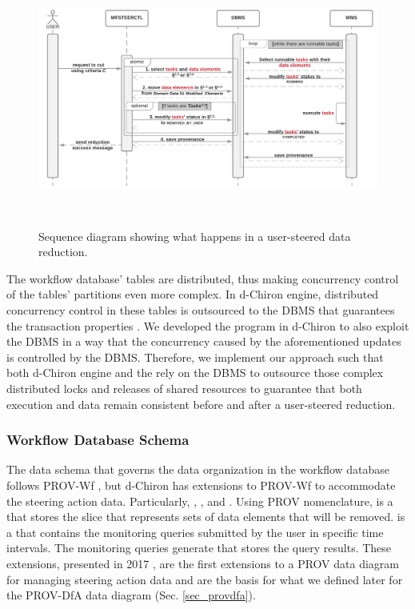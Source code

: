 \begin{figure}[H]
    \centering
    \includegraphics[width=6.06299in,height=3.30315in]{img/dChironSeqDiagram.pdf}
    \caption{Sequence diagram showing what happens in a user-steered data reduction.}
    \label{fig:seq_diagram_data_reduction}
\end{figure}

The workflow database' tables are distributed, thus making concurrency control
of the tables' partitions even more complex. In d-Chiron engine,
distributed concurrency control in these tables is outsourced to the
DBMS that guarantees the  transaction properties \cite{Ozsu2011Principles}.
We developed the
 program in d-Chiron to also exploit the DBMS in a way that the concurrency
caused by the aforementioned updates is controlled by the DBMS.
Therefore, we implement our approach such that both d-Chiron engine and
the  rely on the DBMS to outsource those complex distributed
locks and releases of shared resources to guarantee that both execution
and data remain consistent before and after a user-steered reduction.

\subsubsection{Workflow Database Schema}

The data schema that governs the data organization in the workflow database
follows PROV-Wf \cite{Costa2013Capturing}, but d-Chiron has extensions to PROV-Wf to accommodate the steering action data. 
Particularly,
, ,
and . Using PROV nomenclature,
 is a  that stores the slice that represents sets of data elements that will be removed. 
is a  that contains the monitoring queries submitted
by the user in specific time intervals. The monitoring queries generate
 
that stores the query results. These extensions, presented in 2017 \cite{Souza2017Data}, are the first extensions to a PROV data diagram for managing steering action data and are the basis for what we defined later for the PROV-DfA data diagram \cite{Souza2018Provenance} (Sec. \ref{sec_provdfa}).

